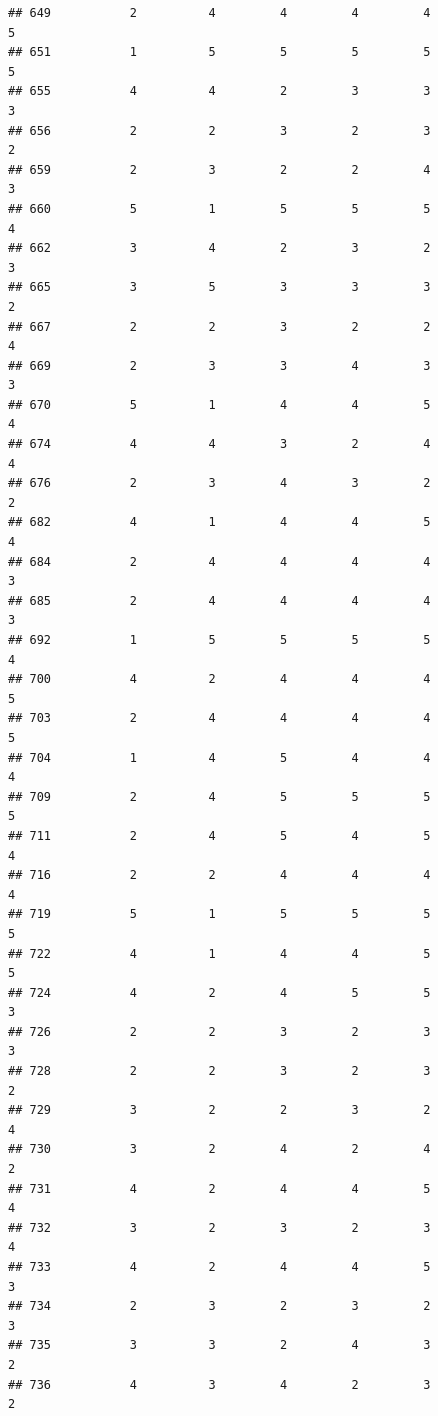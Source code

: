 \documentclass[
]{article}
\begin{document}
\begin{verbatim}
## 649           2          4         4         4         4             5
## 651           1          5         5         5         5             5
## 655           4          4         2         3         3             3
## 656           2          2         3         2         3             2
## 659           2          3         2         2         4             3
## 660           5          1         5         5         5             4
## 662           3          4         2         3         2             3
## 665           3          5         3         3         3             2
## 667           2          2         3         2         2             4
## 669           2          3         3         4         3             3
## 670           5          1         4         4         5             4
## 674           4          4         3         2         4             4
## 676           2          3         4         3         2             2
## 682           4          1         4         4         5             4
## 684           2          4         4         4         4             3
## 685           2          4         4         4         4             3
## 692           1          5         5         5         5             4
## 700           4          2         4         4         4             5
## 703           2          4         4         4         4             5
## 704           1          4         5         4         4             4
## 709           2          4         5         5         5             5
## 711           2          4         5         4         5             4
## 716           2          2         4         4         4             4
## 719           5          1         5         5         5             5
## 722           4          1         4         4         5             5
## 724           4          2         4         5         5             3
## 726           2          2         3         2         3             3
## 728           2          2         3         2         3             2
## 729           3          2         2         3         2             4
## 730           3          2         4         2         4             2
## 731           4          2         4         4         5             4
## 732           3          2         3         2         3             4
## 733           4          2         4         4         5             3
## 734           2          3         2         3         2             3
## 735           3          3         2         4         3             2
## 736           4          3         4         2         3             2

\end{verbatim}
\end{document}
